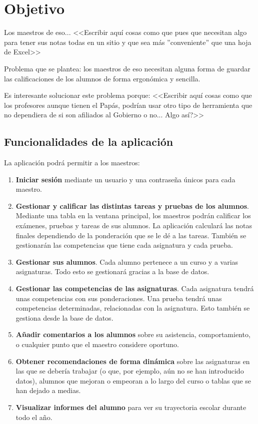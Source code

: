 \chapter{Objetivo}
\label{cap:Objetivo}

Los maestros de \gls{eso}... 
<<Escribir aquí cosas como que pues que necesitan algo para tener sus notas todas en un sitio y que sea más ''conveniente'' que una hoja de Excel>>

Problema que se plantea: los maestros de \gls{eso} necesitan alguna forma de guardar las calificaciones de los alumnos de forma ergonómica y sencilla.

Es interesante solucionar este problema porque: 
<<Escribir aquí cosas como que los profesores aunque tienen el Papás, podrían usar otro tipo de herramienta que no dependiera de si son afiliados al Gobierno o no... Algo así?>>

\section{Funcionalidades de la aplicación} \label{funcionalidades}

La aplicación podrá permitir a los maestros:
\begin{enumerate}
	\item \textbf{Iniciar sesión} mediante un usuario y una contraseña únicos para cada maestro.
	\item \textbf{Gestionar y calificar las distintas tareas y pruebas de los alumnos}. Mediante una tabla en la ventana principal, los maestros podrán calificar los exámenes, pruebas y tareas de sus alumnos. La aplicación calculará las notas finales dependiendo de la ponderación que se le dé a las tareas. También se gestionarán las competencias que tiene cada asignatura y cada prueba.
	\item \textbf{Gestionar sus alumnos}. Cada alumno pertenece a un curso y a varias asignaturas. Todo esto se gestionará gracias a la base de datos.
	\item \textbf{Gestionar las competencias de las asignaturas}. Cada asignatura tendrá unas competencias con sus ponderaciones. Una prueba tendrá unas competencias determinadas, relacionadas con la asignatura. Esto también se gestiona desde la base de datos.
	\item \textbf{Añadir comentarios a los alumnos} sobre su asistencia, comportamiento, o cualquier punto que el maestro considere oportuno.
	\item \textbf{Obtener recomendaciones de forma dinámica} sobre las asignaturas en las que se debería trabajar (o que, por ejemplo, aún no se han introducido datos), alumnos que mejoran o empeoran a lo largo del curso o tablas que se han dejado a medias.
	\item \textbf{Visualizar informes del alumno} para ver su trayectoria escolar durante todo el año.
	

\end{enumerate}

